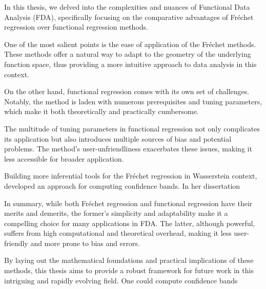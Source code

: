 In this thesis, we delved into the complexities and nuances of Functional Data
Analysis (FDA), specifically focusing on the comparative advantages of Fr\'{e}chet
regression over functional regression methods.

One of the most salient points is the ease of application of the Fr\'{e}chet methods.
These methods offer a natural way to adapt to the geometry of the underlying function
space, thus providing a more intuitive approach to data analysis in this context.

On the other hand, functional regression comes with its own set of challenges. Notably,
the method is laden with numerous prerequisites and tuning parameters, which make it
both theoretically and practically cumbersome.

The multitude of tuning parameters in functional regression not only complicates its
application but also introduces multiple sources of bias and potential problems. The
method's user-unfriendliness exacerbates these issues, making it less accessible for
broader application.

Building more inferential tools for the Fréchet regression in Wasserstein context,
\textcite[cf.]{PetersenLiuDivani2021} developed an approach for computing confidence bands.
In her dissertation

In summary, while both Fr\'{e}chet regression and functional regression have their merits
and demerits, the former's simplicity and adaptability make it a compelling choice for
many applications in FDA. The latter, although powerful, suffers from high computational
and theoretical overhead, making it less user-friendly and more prone to bias and errors.

By laying out the mathematical foundations and practical implications of these methods,
this thesis aims to provide a robust framework for future work in this intriguing and
rapidly evolving field.
One could compute confidence bands
